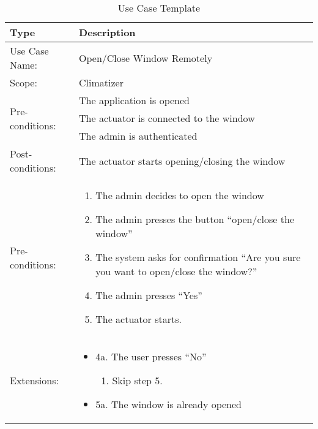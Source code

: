 \documentclass{article}
\begin{document}
	\begin{table}[h!]
		\begin{center}
			\caption{Use Case Template}
			\label{tab:table1}
			\begin{tabular}{l|l}
				\textbf{Type} & \textbf{Description} \\
				\hline
				Use Case Name: & Open/Close Window Remotely \\
				\rowcolor{Gray}
				Scope: & Climatizer\\		
				\multirow{3}{*}{Pre-conditions:} & The application is opened\\ %
				& The actuator is connected to the window\\ %
				& The admin is authenticated \\
				\rowcolor{Gray}
				Post-conditions: & The actuator starts opening/closing the window \\
				Pre-conditions: & \begin{minipage}{3in}
					\vskip 2pt
					\begin{enumerate}
						\item The admin decides to open the window
						\item The admin presses the button “open/close the window”
						\item The system asks for confirmation “Are you sure you want to open/close the window?”
						\item The admin presses “Yes”
						\item The actuator starts.
					\end{enumerate}
					\vskip 2pt
				\end{minipage}\\
				\rowcolor{Gray}
				Extensions: & \begin{minipage}{3in}
					\vskip 2pt
					\begin{itemize}
						
						\item[] 4a. The user presses “No” 
						\begin{enumerate}
							
							\item Skip step 5.
							
						\end{enumerate}
						\item[] 5a. The window is already opened
						\begin{enumerate}
							

\end{enumerate}
\end{itemize}
\end{minipage}
\end{tabular}
\end{center}
\end{table}
\end{document}
